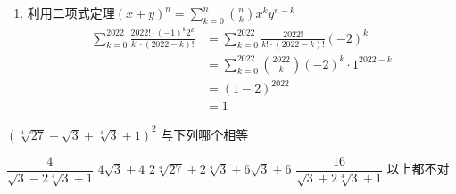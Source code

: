 \documentclass[answers]{exam}
\begin{document}
\begin{questions}
	\begin{solution}
		\begin{enumerate}
			\item 利用二项式定理$\displaystyle(x+y)^n = \sum_{k=0}^{n}\binom{n}{k}x^ky^{n-k}$
			      \begin{align*}
				      \sum_{k=0}^{2022}\frac{2022!\cdot(-1)^k2^k}{k!\cdot(2022-k)!} & = \sum_{k=0}^{2022}\frac{2022!}{k!\cdot
				      (2022-k)!}(-2)^k                                                                                        \\
				                                                                    & =
				      \sum_{k=0}^{2022}\binom{2022}{k}(-2)^k\cdot 1^{2022-k}                                                  \\
				                                                                    & = (1-2)^{2022}                          \\
				                                                                    & = 1
			      \end{align*}
		\end{enumerate}
	\end{solution}

	\question $(\sqrt[4]{27} + \sqrt{3} + \sqrt[4]{3} + 1)^2$ 与下列哪个相等

	\begin{oneparchoices}
		\CorrectChoice \( \dfrac{4}{\sqrt{3} - 2\sqrt[4]{3} + 1} \)
		\choice \( 4\sqrt{3} + 4 \)
		\choice \( 2\sqrt[4]{27} + 2\sqrt[4]{3} + 6\sqrt{3} + 6 \)
		\choice \( \dfrac{16}{\sqrt{3} + 2\sqrt[4]{3} + 1} \)
		\choice 以上都不对
	\end{oneparchoices}


\end{questions}
\end{document}
